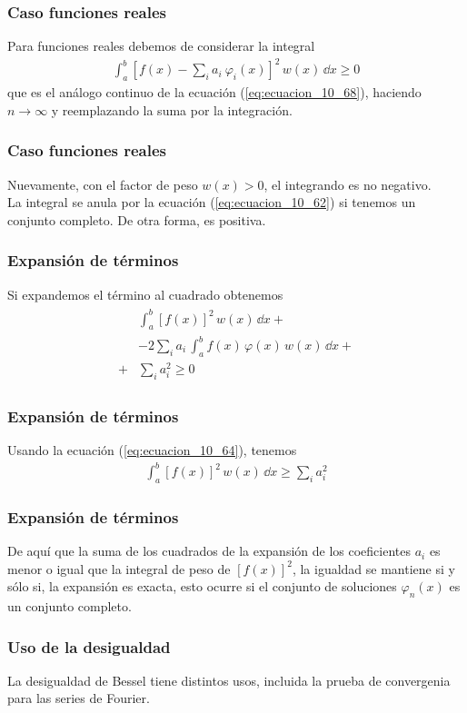 \begin{frame}
\frametitle{Caso funciones reales}
Para funciones reales debemos de considerar la integral
\begin{align}
\int_{a}^{b} \left[ f(x) - \sum_{i} a_{i} \: \varphi_{i}(x) \right]^{2} \, w(x) \, \dd{x} \geq 0
\label{eq:ecuacion_10_71}
\end{align}
que es el análogo continuo de la ecuación (\ref{eq:ecuacion_10_68}), haciendo $n \to \infty$ y reemplazando la suma por la integración. 
\end{frame}
\begin{frame}
\frametitle{Caso funciones reales}
Nuevamente, con el factor de peso $w(x) > 0 $, el integrando es no negativo.
\\
\bigskip
\pause
La integral se anula por la ecuación (\ref{eq:ecuacion_10_62}) si tenemos un conjunto completo. De otra forma, es positiva.
\end{frame}
\begin{frame}
\frametitle{Expansión de términos}
Si expandemos el término al cuadrado obtenemos
\begin{align}
\begin{aligned}
&\int_{a}^{b} [ f(x) ]^{2} \, w(x) \, \dd{x} + \\
&- 2 \sum_{i} a_{i} \, \int_{a}^{b} f(x) \, \varphi (x) \, w(x) \, \dd{x} + \\
+& \sum_{i} a_{i}^{2} \geq 0
\end{aligned}
\label{eq:ecuacion_10_72}
\end{align}
\end{frame}
\begin{frame}
\frametitle{Expansión de términos}
Usando la ecuación (\ref{eq:ecuacion_10_64}), tenemos
\begin{align}
\int_{a}^{b} [f(x)]^{2} \, w(x) \, \dd{x} \geq \sum_{i} a_{i}^{2}
\label{eq:ecuacion_10_73}
\end{align}
\end{frame}
\begin{frame}
\frametitle{Expansión de términos}
De aquí que la suma de los cuadrados de la expansión de los coeficientes $a_{i}$ es menor o igual que la integral de peso de $[f(x)]^{2}$, la igualdad se mantiene si y sólo si, la expansión es exacta, esto ocurre si el conjunto de soluciones $\varphi_{n}(x)$ es un conjunto completo.
\end{frame}
\begin{frame}
\frametitle{Uso de la desigualdad}
La desigualdad de Bessel tiene distintos usos, incluida la prueba de convergenia para las series de Fourier.
\end{frame}
